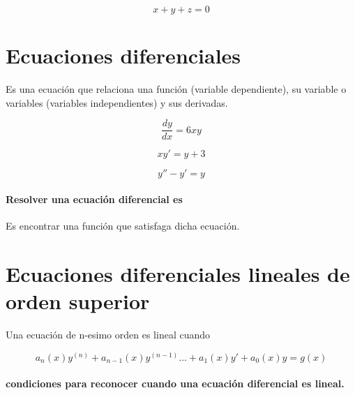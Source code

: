 \documentclass{article}
\begin{document}
\begin{equation}
x+y+z=0
\end{equation}

\section{Ecuaciones diferenciales }
Es una ecuación que relaciona una función (variable dependiente), su variable o variables (variables independientes) y sus derivadas.

\begin{equation}
	\frac{dy}{dx}= 6xy
\end{equation}

\begin{equation}
	xy'=y+3
\end{equation}

\begin{equation}
	y''-y'=y
\end{equation}

\paragraph{Resolver una ecuación diferencial es} Es encontrar una función que satisfaga dicha ecuación. 

\section{Ecuaciones diferenciales lineales de orden superior }

Una ecuación de n-esimo orden es lineal cuando


\begin{equation}
a_n(x)y^{(n)}+a_{n-1}(x)y^{(n-1)}...+a_1(x)y'+a_0(x)y= g(x)
\end{equation}


\paragraph{condiciones para reconocer cuando una ecuación diferencial es lineal.}
\end{document}
